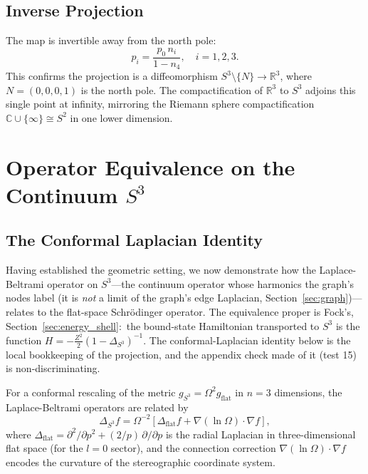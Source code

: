 \documentclass[aps,pra,twocolumn,superscriptaddress,longbibliography]{revtex4-2}
\begin{document}
\subsection{Inverse Projection}

The map is invertible away from the north pole:
\begin{equation}
p_i = \frac{p_0\, n_i}{1 - n_4}, \quad i = 1, 2, 3.
\label{eq:inverse}
\end{equation}
This confirms the projection is a diffeomorphism $S^3 \setminus \{N\} \to \mathbb{R}^3$, where $N = (0,0,0,1)$ is the north pole. The compactification of $\mathbb{R}^3$ to $S^3$ adjoins this single point at infinity, mirroring the Riemann sphere compactification $\mathbb{C} \cup \{\infty\} \cong S^2$ in one lower dimension.


\section{Operator Equivalence on the Continuum $S^3$}
\label{sec:operator}

\subsection{The Conformal Laplacian Identity}

Having established the geometric setting, we now demonstrate how the Laplace-Beltrami operator on $S^3$---the continuum operator whose harmonics the graph's nodes label (it is \emph{not} a limit of the graph's edge Laplacian, Section~\ref{sec:graph})---relates to the flat-space Schr\"odinger operator. The equivalence proper is Fock's, Section~\ref{sec:energy_shell}:\ the bound-state Hamiltonian transported to $S^3$ is the function $H = -\tfrac{Z^2}{2}(1-\Delta_{S^3})^{-1}$. The conformal-Laplacian identity below is the local bookkeeping of the projection, and the appendix check made of it (test 15) is non-discriminating.

For a conformal rescaling of the metric $g_{S^3} = \Omega^2 g_{\text{flat}}$ in $n = 3$ dimensions, the Laplace-Beltrami operators are related by
\begin{equation}
\Delta_{S^3} f = \Omega^{-2}\left[\Delta_{\text{flat}} f + \nabla(\ln\Omega) \cdot \nabla f\right],
\label{eq:conformal_laplacian}
\end{equation}
where $\Delta_{\text{flat}} = \partial^2/\partial p^2 + (2/p)\,\partial/\partial p$ is the radial Laplacian in three-dimensional flat space (for the $l = 0$ sector), and the connection correction $\nabla(\ln\Omega) \cdot \nabla f$ encodes the curvature of the stereographic coordinate system.
\end{document}
